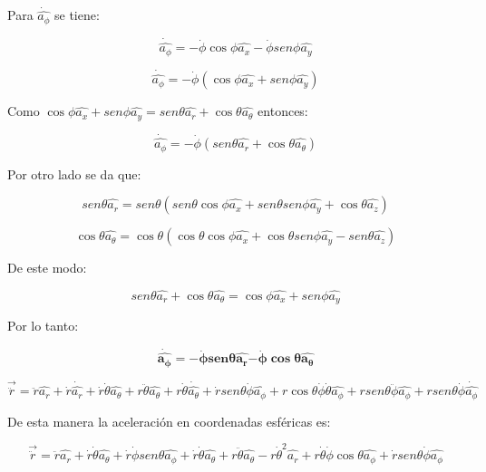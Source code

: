 \documentclass[]{article}
\begin{document}
Para \(\dot{\widehat{a_{\phi}}}\) se tiene:

\[\dot{\widehat{a_{\phi}}} = - \dot{\phi}\cos\phi\widehat{a_{x}} - \dot{\phi}{sen}\phi\widehat{a_{y}}\]

\[\dot{\widehat{a_{\phi}}} = - \dot{\phi}(\cos\phi\widehat{a_{x}} + {sen}\phi\widehat{a_{y}})\]

Como
\(\cos\phi\widehat{a_{x}} + {sen}\phi\widehat{a_{y}} = {sen}\theta\widehat{a_{r}} + \cos\theta\widehat{a_{\theta}}\)
entonces:

\[\dot{\widehat{a_{\phi}}} = - \dot{\phi}({sen}\theta\widehat{a_{r}} + \cos\theta\widehat{a_{\theta}})\]

Por otro lado se da que:

\[{sen}\theta\widehat{a_{r}} = {sen}\theta({sen}\theta\cos\phi\widehat{a_{x}} + {sen}\theta{sen}\phi\widehat{a_{y}} + \cos\theta\widehat{a_{z}})\]

\[\cos\theta\widehat{a_{\theta}} = \cos\theta(\cos\theta\cos\phi\widehat{a_{x}} + \cos\theta{sen}\phi\widehat{a_{y}} - {sen}\theta\widehat{a_{z}})\]

De este modo:

\[{sen}\theta\widehat{a_{r}} + \cos\theta\widehat{a_{\theta}} = \cos\phi\widehat{a_{x}} + {sen}\phi\widehat{a_{y}}\]

Por lo tanto:

\[\dot{\widehat{\mathbf{a}_{\mathbf{\phi}}}}\mathbf{= -}\dot{\mathbf{\phi}}\mathbf{sen}\mathbf{\theta}\widehat{\mathbf{a}_{\mathbf{r}}}\mathbf{-}\dot{\mathbf{\phi}}\mathbf{\cos}\mathbf{\theta}\widehat{\mathbf{a}_{\mathbf{\theta}}}\]

\[\overrightarrow{\ddot{r}} = \ddot{r}\widehat{a_{r}} + \dot{r}\dot{\widehat{a_{r}}} + \dot{r}\dot{\theta}\widehat{a_{\theta}} + r\ddot{\theta}\widehat{a_{\theta}} + r\dot{\theta}\dot{\widehat{a_{\theta}}} + \dot{r}{sen}{\theta\dot{\phi}}\widehat{a_{\phi}} + r\cos{\theta\dot{\phi}}\dot{\theta}\widehat{a_{\phi}} + r{sen}\theta\ddot{\phi}\widehat{a_{\phi}} + r{sen}{\theta\dot{\phi}\dot{\widehat{a_{\phi}}}}\]

De esta manera la aceleración en coordenadas esféricas es:

\[\overrightarrow{\ddot{r}} = \ddot{r}\widehat{a_{r}} + \dot{r}\dot{\theta}\widehat{a_{\theta}} + \dot{r}\dot{\phi}{sen}\theta\widehat{a_{\phi}} + \dot{r}\dot{\theta}\widehat{a_{\theta}} + r\ddot{\theta}\widehat{a_{\theta}} - r{\dot{\theta}}^{2}\widehat{a_{r}} + r\dot{\theta}\dot{\phi}\cos\theta\widehat{a_{\phi}} + \dot{r}{sen}\theta\dot{\phi}\widehat{a_{\phi}}\]
\end{document}
